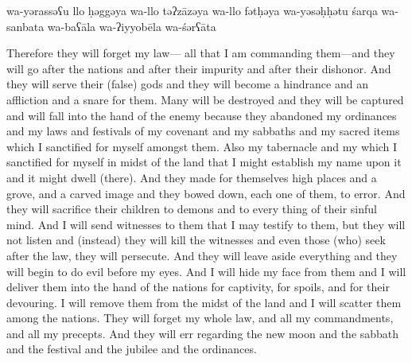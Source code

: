 \begin{transliteration}
    wa-yərassəʕu llo ḥəggəya
    wa-llo təʔzāzəya wa-llo fətḥəya wa-yəsəḥḥətu śarqa wa-sanbata
    wa-baʕāla wa-ʔiyyobēla wa-śərʕāta
\end{transliteration}

\begin{translation}
    Therefore they will forget my law---%
    all that I am commanding them---and they will go after the nations and after
    their impurity and after their dishonor. And they will serve their (false) gods
    and they will become a hindrance and an affliction and a snare for them.
    Many will be destroyed and they will be captured and will fall into
    the hand of the enemy because they abandoned my ordinances and my laws and festivals of 
    my covenant and my sabbaths and my sacred items which I sanctified for myself amongst them.
    Also my tabernacle and my \temple which I sanctified for myself in midst of
    the land that I might establish my name upon it and it might dwell (there).
    And they made
    for themselves high places and a grove, and a carved image and they bowed down, each one of them,
    to error. And they will sacrifice their children to demons and to every thing
    of their sinful mind.
    And I will send witnesses to them that
    I may testify to them, but they will not listen and (instead) they will kill the witnesses and even
    those (who) seek after the law, they will persecute. And they will leave aside everything and they will begin to do
    evil before my eyes.
    And I will hide my face
    from them and I will deliver them into the hand of the nations for captivity,
    for spoils, and for their devouring. I will remove them from the midst of the land
    and I will scatter them among the nations.
    They will forget my whole law,
    and all my commandments, and all my precepts. And they will err regarding the new moon and the sabbath
    and the festival and the jubilee and the ordinances.
\end{translation}